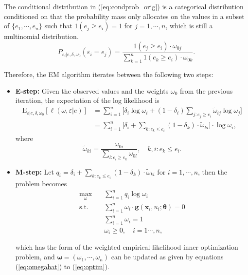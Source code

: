 \documentclass[article]{jss}
\renewcommand{\|}{\,|\,}
\begin{document}
The conditional distribution in (\ref{eq:condprob_orig}) is a categorical distribution conditioned on that the probability mass only allocates on the values in a subset of \(\{e_1,\cdots,e_n\}\) such that \(\mathfrak 1(e_j\geq e_i) = 1\) for \(j=1,\cdots,n\), which is still a multinomial distribution.
\begin{equation}\label{eq:condprob_orig}
  P_{\varepsilon_i|e,\delta,\omega_0}(\varepsilon_i=e_j) =
  \frac{\mathfrak 1(e_j\geq e_i)\cdot \omega_{0j}}{\sum_{k=1}^n\mathfrak 1(e_k\geq e_i)\cdot\omega_{0k}}.
\end{equation}

Therefore, the EM algorithm iterates between the following two steps:

\begin{itemize}
\item \textbf{E-step:} Given the observed values and the weights $\omega_0$ from the previous iteration, the expectation of the log likelihood is
\begin{equation}\label{eq:emestep}
\begin{split}
  \textrm{E}_{\varepsilon|e,\delta,\omega_0}[\ell(\omega,\varepsilon|e)]
  &= \sum_{i=1}^n \Big[\delta_i \log \omega_i +
    (1-\delta_i) \sum_{j: e_j\geq e_i} \tilde \omega_{ij} \log \omega_j\Big] \\
  &= \sum_{i=1}^n \Big[\delta_i + \sum_{k: e_k\leq e_i} (1-\delta_k)
      \cdot\tilde\omega_{ki}\Big]\cdot\log \omega_i,
\end{split}
\end{equation}
where
\[
  \tilde \omega_{ki} = \frac{\omega_{0i}}{\sum_{l: e_l\geq e_k}\omega_{0l}}, \quad k,i: e_k\leq e_i.
\]

\item \textbf{M-step:}
Let $q_i = \delta_i + \sum_{k: e_k\leq e_i} (1-\delta_k)\cdot \tilde \omega_{ki}$ for $i=1,\cdots,n$, then the problem becomes
\begin{equation}\label{eq:emmstep}
\begin{split}
  \max_{\omega}\quad & \sum_{i=1}^n q_i \log \omega_i \\
  \mbox{s.t.}\quad & \sum_{i=1}^n \omega_i\cdot \bm g(\bm x_i,u_i;\bm \theta) = 0 \\
  & \sum_{i=1}^n \omega_i = 1 \\
  & \omega_i \geq 0, \quad i=1\cdots,n,
\end{split}
\end{equation}

which has the form of the weighted empirical likelihood inner optimization problem, and $\bm \omega= (\omega_1,\cdots,\omega_n)$ can be updated as given by equations (\ref{eq:omegahat}) to (\ref{eq:optim}).

\end{itemize}
\end{document}
